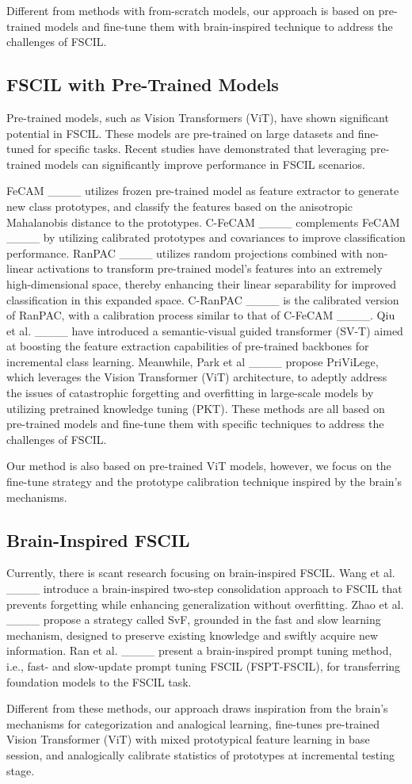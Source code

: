 Different from methods with from-scratch models, our approach is based on pre-trained models and fine-tune them with  brain-inspired technique to address the challenges of FSCIL.
\subsection{FSCIL with Pre-Trained Models}
Pre-trained models, such as Vision Transformers (ViT), have shown significant potential in FSCIL. These models are pre-trained on large datasets and fine-tuned for specific tasks. Recent studies have demonstrated that leveraging pre-trained models can significantly improve performance in FSCIL scenarios. 

FeCAM ____ utilizes frozen pre-trained model as feature extractor to generate new class prototypes, and classify the features based on the anisotropic Mahalanobis distance to the prototypes. C-FeCAM ____ complements FeCAM ____ by utilizing calibrated prototypes and covariances to improve classification performance. RanPAC ____ utilizes random projections combined with non-linear activations to transform pre-trained model's features into an extremely high-dimensional space, thereby enhancing their linear separability for improved classification in this expanded space. C-RanPAC ____ is the calibrated version of RanPAC, with a calibration process similar to that of C-FeCAM ____. Qiu et al. ____ have introduced a semantic-visual guided transformer (SV-T) aimed at boosting the feature extraction capabilities of pre-trained backbones for incremental class learning. Meanwhile, Park et al ____ propose PriViLege, which leverages the Vision Transformer (ViT) architecture, to adeptly address the issues of catastrophic forgetting and overfitting in large-scale models by utilizing pretrained knowledge tuning (PKT). These methods are all based on pre-trained models and fine-tune them with specific techniques to address the challenges of FSCIL. 

Our method is also based on pre-trained ViT models, however, we focus on the fine-tune strategy and the prototype calibration technique inspired by the brain's mechanisms. 
\subsection{Brain-Inspired FSCIL}
Currently, there is scant research focusing on brain-inspired FSCIL. Wang et al. ____ introduce a brain-inspired two-step consolidation approach to FSCIL that prevents forgetting while enhancing generalization without overfitting. Zhao et al. ____ propose a strategy called SvF, grounded in the fast and slow learning mechanism, designed to preserve existing knowledge and swiftly acquire new information. Ran et al. ____ present a brain-inspired prompt tuning method, i.e., fast- and slow-update prompt tuning FSCIL (FSPT-FSCIL), for transferring foundation models to the FSCIL task. 

Different from these methods, our approach draws inspiration from the brain's mechanisms for categorization and analogical learning, fine-tunes pre-trained Vision Transformer (ViT) with mixed prototypical feature learning in base session, and analogically calibrate statistics of prototypes at incremental testing stage.